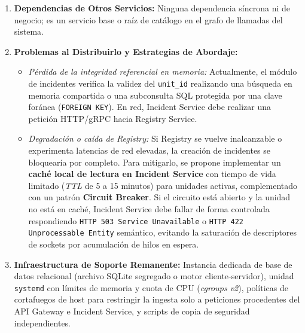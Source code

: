 \documentclass[10pt,a4paper]{article}
\begin{document}
\begin{enumerate}[leftmargin=*]
\begin{itemize}[leftmargin=*]
        \item \texttt{POST /api/v1/operators} y \texttt{GET /api/v1/operators} / \texttt{GET /api/v1/operators/\{id\}} (gestión y consulta de operadores).
        \item \texttt{GET /api/v1/units/\{id\}/validate} (verificación ligera de existencia y estado activo para consumo entre servicios).
    \end{itemize}
    \item \textbf{Dependencias de Otros Servicios:} Ninguna dependencia síncrona ni de negocio; es un servicio base o raíz de catálogo en el grafo de llamadas del sistema.
    \item \textbf{Problemas al Distribuirlo y Estrategias de Abordaje:}
    \begin{itemize}[leftmargin=*]
        \item \textit{Pérdida de la integridad referencial en memoria:} Actualmente, el módulo de incidentes verifica la validez del \texttt{unit\_id} realizando una búsqueda en memoria compartida o una subconsulta SQL protegida por una clave foránea (\texttt{FOREIGN KEY}). En red, Incident Service debe realizar una petición HTTP/gRPC hacia Registry Service.
        \item \textit{Degradación o caída de Registry:} Si Registry se vuelve inalcanzable o experimenta latencias de red elevadas, la creación de incidentes se bloquearía por completo. Para mitigarlo, se propone implementar un \textbf{caché local de lectura en Incident Service} con tiempo de vida limitado (\textit{TTL} de 5 a 15 minutos) para unidades activas, complementado con un patrón \textbf{Circuit Breaker}. Si el circuito está abierto y la unidad no está en caché, Incident Service debe fallar de forma controlada respondiendo \texttt{HTTP 503 Service Unavailable} o \texttt{HTTP 422 Unprocessable Entity} semántico, evitando la saturación de descriptores de sockets por acumulación de hilos en espera.
    \end{itemize}
    \item \textbf{Infraestructura de Soporte Remanente:} Instancia dedicada de base de datos relacional (archivo SQLite segregado o motor cliente-servidor), unidad \texttt{systemd} con límites de memoria y cuota de CPU (\textit{cgroups v2}), políticas de cortafuegos de host para restringir la ingesta solo a peticiones procedentes del API Gateway e Incident Service, y scripts de copia de seguridad independientes.
\end{enumerate}

\end{document}
